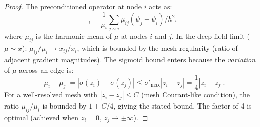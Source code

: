 \documentclass[11pt]{article}
\theoremstyle{definition}
\theoremstyle{remark}
\begin{document}
\begin{proof}
The preconditioned operator at node $i$ acts as:
\begin{equation}
  [P_\mu L_\mu \psi]_i = \frac{1}{\mu_i}\sum_{j \sim i}
  \mu_{ij}(\psi_j - \psi_i)/h^2,
\end{equation}
where $\mu_{ij}$ is the harmonic mean of $\mu$ at nodes $i$ and $j$.
In the deep-field limit ($\mu \sim x$): $\mu_{ij}/\mu_i \to x_{ij}/x_i$,
which is bounded by the mesh regularity (ratio of adjacent gradient
magnitudes). The sigmoid bound enters because the \emph{variation} of
$\mu$ across an edge is:
\begin{equation}
  |\mu_i - \mu_j| = |\sigma(z_i) - \sigma(z_j)| \leq \sigma'_{\max} |z_i - z_j|
  = \frac{1}{4}|z_i - z_j|.
\end{equation}
For a well-resolved mesh with $|z_i - z_j| \leq C$ (mesh Courant-like
condition), the ratio $\mu_{ij}/\mu_i$ is bounded by $1 + C/4$, giving
the stated bound. The factor of 4 is optimal (achieved when
$z_i = 0$, $z_j \to \pm\infty$).
\end{proof}
\end{document}
